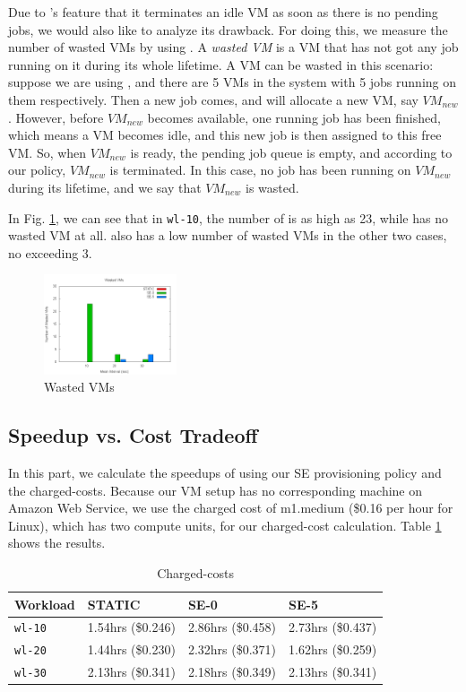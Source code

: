Due to \SE{}'s feature that it terminates an idle VM as soon as there is
no pending jobs, we would also like to analyze its drawback.
For doing this, we measure the number of wasted VMs by using \SE{}.
A \emph{wasted VM} is a VM that has not got any job running on it during
its whole lifetime.
A VM can be wasted in this scenario: suppose we are using \SEzero{},
and there are 5 VMs in the system with 5 jobs running on them
respectively. Then a new job comes, and \SEzero{} will allocate a new VM,
say $VM_{new}$. However, before $VM_{new}$ becomes available, one
running job has been finished, which means a VM becomes idle, and this
new job is then assigned to this free VM. So, when $VM_{new}$ is
ready, the pending job queue is empty, and according to our policy,
$VM_{new}$ is terminated. In this case, no job has been running on
$VM_{new}$ during its lifetime, and we say that $VM_{new}$ is wasted.

In Fig. \ref{figure_vm_wasted}, we can see that in \texttt{wl-10},
the number of \SEzero is as high as 23, while \SEfive has no wasted VM
at all. \SEfive also has a low number of wasted VMs in the other two cases,
no exceeding 3.

\begin{figure}[!t]
\centering
\includegraphics[width=0.35\textwidth]{pictures/vm-wasted.png}
\caption{Wasted VMs}
\label{figure_vm_wasted}
\end{figure}


\subsection{Speedup vs. Cost Tradeoff}
In this part, we calculate the speedups of using our SE provisioning
policy and the charged-costs. Because our VM setup has no
corresponding machine on Amazon Web Service, we use the charged cost
of m1.medium (\$0.16 per hour for Linux), which has two compute units,
for our charged-cost calculation. Table \ref{table_chargedcosts} shows
the results.

\begin{table}
\caption{Charged-costs}
\label{table_chargedcosts}
\centering
\begin{tabular}{|l|l|l|l|}
\hline
Workload & STATIC & SE-0 & SE-5 \\
\hline
\texttt{wl-10} & 1.54hrs (\$0.246) & 2.86hrs (\$0.458) & 2.73hrs (\$0.437) \\
\hline
\texttt{wl-20} & 1.44hrs (\$0.230) & 2.32hrs (\$0.371) & 1.62hrs (\$0.259) \\
\hline
\texttt{wl-30} & 2.13hrs (\$0.341) & 2.18hrs (\$0.349) & 2.13hrs (\$0.341) \\
\hline
\end{tabular}
\end{table}

